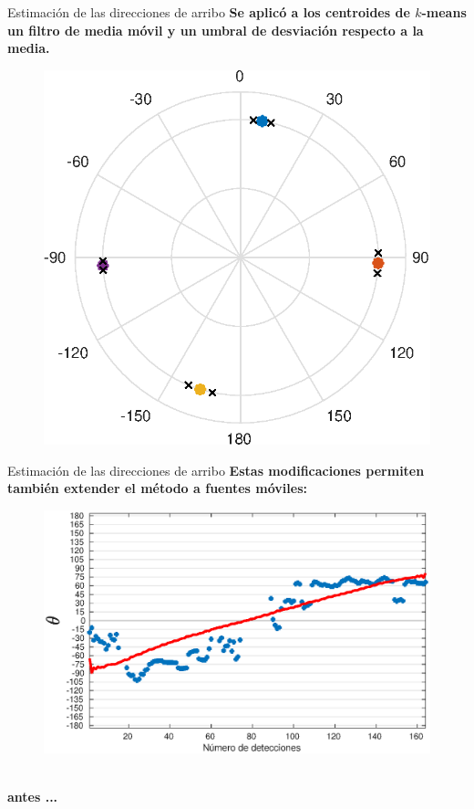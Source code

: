 \documentclass[12pt,aspectratio=169]{beamer}
\begin{document}
	\begin{frame}{Estimación de las direcciones de arribo}
		\textbf{Se aplicó a los centroides de $k$-means un filtro de media móvil y un umbral de desviación respecto a la media.}
		
		\begin{figure}[h]
			\centering
			\includegraphics[width=0.4\linewidth]{figures/polar4color}
		\end{figure}
	\end{frame}
	
	\begin{frame}{Estimación de las direcciones de arribo}
		\textbf{Estas modificaciones permiten también extender el método a fuentes móviles:}
		
		\hspace{20mm}
		\begin{minipage} {105mm}
			\begin{figure}[h]
				\centering
				\includegraphics[width=\linewidth]{figures/moving1nomean}
			\end{figure}
		\end{minipage}\\
		\hspace{130mm}\textbf{antes ...}
	\end{frame}
	
\end{document}
